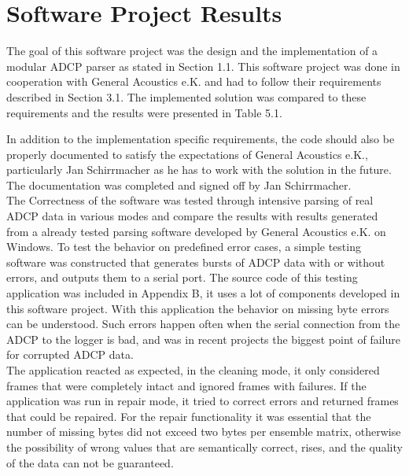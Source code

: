 \section{Software Project Results}

The goal of this software project was the design and the implementation of a modular ADCP parser as stated in Section 1.1. This software project was done in cooperation with General Acoustics e.K. and had to follow their requirements described in Section 3.1. The implemented solution was compared to these requirements and the results were presented in Table 5.1.

In addition to the implementation specific requirements, the code should also be properly documented to satisfy the expectations of General Acoustics e.K., particularly Jan Schirrmacher as he has to work with the solution in the future. The documentation was completed and signed off by Jan Schirrmacher.\\
The Correctness of the software was tested through intensive parsing of real ADCP data in various modes and compare the results with results generated from a already tested parsing software developed by General Acoustics e.K. on Windows. To test the behavior on predefined error cases, a simple testing software was constructed that generates bursts of ADCP data with or without errors, and outputs them to a serial port. The source code of this testing application was included in Appendix B, it uses a lot of components developed in this software project. With this application the behavior on missing byte errors can be understood. Such errors happen often when the serial connection from the ADCP to the logger is bad, and was in recent projects the biggest point of failure for corrupted ADCP data.\\
The application reacted as expected, in the cleaning mode, it only considered frames that were completely intact and ignored frames with failures. If the application was run in repair mode, it tried to correct errors and returned frames that could be repaired. For the repair functionality it was essential that the number of missing bytes did not exceed two bytes per ensemble matrix, otherwise the possibility of wrong values that are semantically correct, rises, and the quality of the data can not be guaranteed.\\

